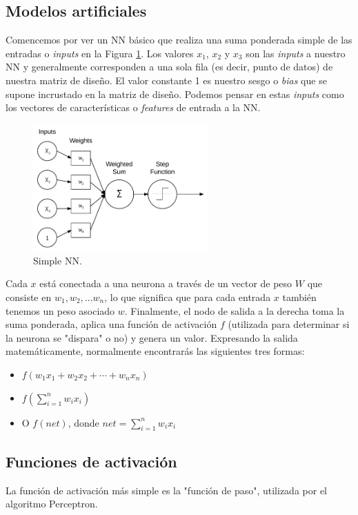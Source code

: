 \documentclass[a4paper,12pt]{article}
\begin{document}
\subsection{Modelos artificiales}
Comencemos por ver un NN básico que realiza una suma ponderada simple de las entradas o \textit{inputs} en la Figura \ref{fig:simplenn}. Los valores $x_1$, $x_2$ y $x_3$ son las \textit{inputs} a nuestro NN y generalmente corresponden a una sola fila (es decir, punto de datos) de nuestra matriz de diseño. El valor constante 1 es nuestro sesgo o \textit{bias} que se supone incrustado en la matriz de diseño. Podemos pensar en estas \textit{inputs} como los vectores de características o \textit{features} de entrada a la NN.

\begin{figure}[H]
	\begin{center}				
	\includegraphics[width=0.6\textwidth]{020.png}
  	\caption{Simple NN.}
  	\label{fig:simplenn}
  	\end{center}
\end{figure}

Cada $x$ está conectada a una neurona a través de un vector de peso $W$ que consiste en $w_1, w_2, \ldots w_n$, lo que significa que para cada entrada $x$ también tenemos un peso asociado $w$.
Finalmente, el nodo de salida a la derecha toma la suma ponderada, aplica una función de activación $f$ (utilizada para determinar si la neurona se "dispara" o no) y genera un valor. Expresando la salida matemáticamente, normalmente encontrarás las siguientes tres formas:
\begin{itemize}
\item $f(w_1x_1 + w_2x_2 + \cdots + w_nx_n)$
\item $f(\sum_{i=1}^{n} w_ix_i)$	
\item O $f(net)$, donde $net = \sum_{i=1}^{n} w_ix_i$
\end{itemize}

\subsection{Funciones de activación}
La función de activación más simple es la "función de paso", utilizada por el algoritmo Perceptron.
\end{document}
